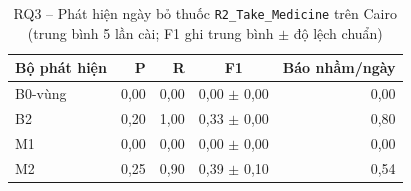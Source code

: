 \begin{table}[htbp]
\centering
\caption{RQ3 -- Phát hiện ngày bỏ thuốc \texttt{R2\_Take\_Medicine} trên Cairo (trung bình 5 lần cài; F1 ghi trung bình $\pm$ độ lệch chuẩn)}
\label{tab:rq3}
\small
\begin{tabular}{lrrcr}
\toprule
Bộ phát hiện & P & R & F1 & Báo nhầm/ngày \\
\midrule
B0-vùng & 0{,}00 & 0{,}00 & 0{,}00 $\pm$ 0{,}00 & 0{,}00 \\
B2 & 0{,}20 & 1{,}00 & 0{,}33 $\pm$ 0{,}00 & 0{,}80 \\
M1 & 0{,}00 & 0{,}00 & 0{,}00 $\pm$ 0{,}00 & 0{,}00 \\
M2 & 0{,}25 & 0{,}90 & 0{,}39 $\pm$ 0{,}10 & 0{,}54 \\
\bottomrule
\end{tabular}
\end{table}
